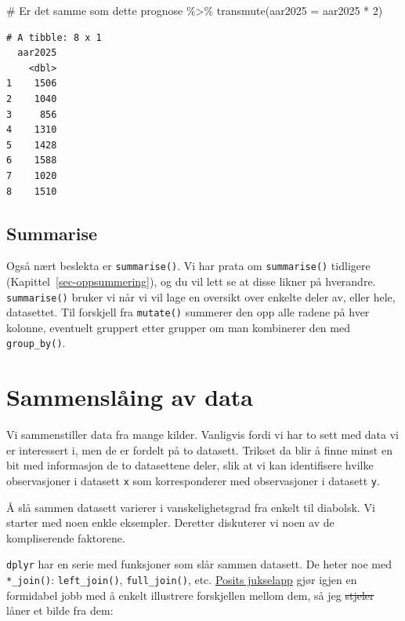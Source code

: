 \documentclass[
  letterpaper,
  DIV=11,
  numbers=noendperiod]{scrreprt}
\newenvironment{Shaded}{\begin{snugshade}}{\end{snugshade}}
\newcommand{\AttributeTok}[1]{\textcolor[rgb]{0.40,0.45,0.13}{#1}}
\newcommand{\CommentTok}[1]{\textcolor[rgb]{0.37,0.37,0.37}{#1}}
\newcommand{\DecValTok}[1]{\textcolor[rgb]{0.68,0.00,0.00}{#1}}
\newcommand{\FunctionTok}[1]{\textcolor[rgb]{0.28,0.35,0.67}{#1}}
\newcommand{\NormalTok}[1]{\textcolor[rgb]{0.00,0.23,0.31}{#1}}
\newcommand{\SpecialCharTok}[1]{\textcolor[rgb]{0.37,0.37,0.37}{#1}}
\begin{document}
\begin{Shaded}
\begin{Highlighting}[]
\CommentTok{\# Er det samme som dette}
\NormalTok{prognose }\SpecialCharTok{\%\textgreater{}\%} 
  \FunctionTok{transmute}\NormalTok{(}\AttributeTok{aar2025 =}\NormalTok{ aar2025 }\SpecialCharTok{*} \DecValTok{2}\NormalTok{)}
\end{Highlighting}
\end{Shaded}

\begin{verbatim}
# A tibble: 8 x 1
  aar2025
    <dbl>
1    1506
2    1040
3     856
4    1310
5    1428
6    1588
7    1020
8    1510
\end{verbatim}

\hypertarget{summarise}{%
\section{Summarise}\label{summarise}}

Også nært beslekta er \texttt{summarise()}. Vi har prata om
\texttt{summarise()} tidligere (Kapittel~\ref{sec-oppsummering}), og du
vil lett se at disse likner på hverandre. \texttt{summarise()} bruker vi
når vi vil lage en oversikt over enkelte deler av, eller hele,
datasettet. Til forskjell fra \texttt{mutate()} summerer den opp alle
radene på hver kolonne, eventuelt gruppert etter grupper om man
kombinerer den med \texttt{group\_by()}.


\hypertarget{sammensluxe5ing-av-data}{%
\chapter{Sammenslåing av data}\label{sammensluxe5ing-av-data}}

Vi sammenstiller data fra mange kilder. Vanligvis fordi vi har to sett
med data vi er interessert i, men de er fordelt på to datasett. Trikset
da blir å finne minst en bit med informasjon de to datasettene deler,
slik at vi kan identifisere hvilke observasjoner i datasett \texttt{x}
som korresponderer med observasjoner i datasett \texttt{y}.

Å slå sammen datasett varierer i vanskelighetsgrad fra enkelt til
diabolsk. Vi starter med noen enkle eksempler. Deretter diskuterer vi
noen av de kompliserende faktorene.

\texttt{dplyr} har en serie med funksjoner som slår sammen datasett. De
heter noe med \texttt{*\_join()}: \texttt{left\_join()},
\texttt{full\_join()}, etc.
\href{https://posit.co/resources/cheatsheets/}{Posits jukselapp} gjør
igjen en formidabel jobb med å enkelt illustrere forskjellen mellom dem,
så jeg \sout{stjeler} låner et bilde fra dem:
\end{document}
